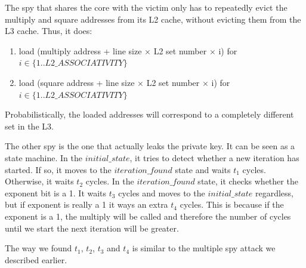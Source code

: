 \documentclass[12pt]{article}
\begin{document}
The spy that shares the core with the victim only has to repeatedly evict the multiply and square addresses from its L2 cache, without evicting them from the L3 cache. Thus, it does:
\begin{enumerate} 
    \item load (multiply address + line size $\times$ L2 set number  $\times$ i) for $i \in \{1..L2\_ASSOCIATIVITY\}$
    \item load (square address + line size $\times$ L2 set number  $\times$ i) for $i \in \{1..L2\_ASSOCIATIVITY\}$
\end{enumerate}

Probabilistically, the loaded addresses will correspond to a completely different set in the L3.

The other spy is the one that actually leaks the private key. It can be seen as a state machine. 
In the $initial\_state$, it tries to detect whether a new iteration has started. If so, it moves to the $iteration\_found$ state and waits $t_1$ cycles. Otherwise, it waits $t_2$ cycles.
In the $iteration\_found$ state, it checks whether the exponent bit is a 1. It waits $t_3$ cycles and moves to the $initial\_state$ regardless, but if exponent is really a 1 it ways an extra $t_4$ cycles. This is because if the exponent is a 1, the multiply will be called and therefore the number of cycles until we start the next iteration will be greater.

The way we found $t_1$, $t_2$, $t_3$ and $t_4$ is similar to the multiple spy attack we described earlier. \\
\end{document}
